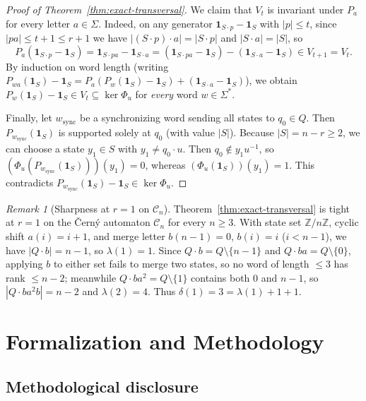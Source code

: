 \documentclass[11pt]{article}
\theoremstyle{definition}
\theoremstyle{remark}
\newtheorem{remark}[theorem]{Remark}
\newcommand{\ind}{\mathbf{1}}
\newcommand{\Z}{\mathbb{Z}}
\begin{document}
\begin{proof}[Proof of Theorem~\ref{thm:exact-transversal}]
We claim that $V_t$ is invariant under $P_a$ for every letter $a \in \Sigma$. Indeed, on any generator $\ind_{S \cdot p} - \ind_S$ with $|p| \le t$, since $|p a| \le t + 1 \le r + 1$ we have $|(S \cdot p) \cdot a| = |S \cdot p|$ and $|S \cdot a| = |S|$, so
\[
  P_a(\ind_{S \cdot p} - \ind_S) = \ind_{S \cdot p a} - \ind_{S \cdot a}
  = (\ind_{S \cdot p a} - \ind_S) - (\ind_{S \cdot a} - \ind_S) \in V_{t + 1} = V_t.
\]
By induction on word length (writing $P_{wa}(\ind_S) - \ind_S = P_a(P_w(\ind_S) - \ind_S) + (\ind_{S \cdot a} - \ind_S)$), we obtain $P_w(\ind_S) - \ind_S \in V_t \subseteq \ker \Phi_u$ for \emph{every} word $w \in \Sigma^*$.

Finally, let $w_{\mathrm{sync}}$ be a synchronizing word sending all states to $q_0 \in Q$. Then $P_{w_{\mathrm{sync}}}(\ind_S)$ is supported solely at $q_0$ (with value $|S|$). Because $|S| = n - r \ge 2$, we can choose a state $y_1 \in S$ with $y_1 \ne q_0 \cdot u$. Then $q_0 \notin y_1 u^{-1}$, so $(\Phi_u(P_{w_{\mathrm{sync}}}(\ind_S)))(y_1) = 0$, whereas $(\Phi_u(\ind_S))(y_1) = 1$. This contradicts $P_{w_{\mathrm{sync}}}(\ind_S) - \ind_S \in \ker \Phi_u$.
\end{proof}

\begin{remark}[Sharpness at $r = 1$ on $\mathcal{C}_n$]\label{rem:exact-transversal-sharp}
Theorem~\ref{thm:exact-transversal} is tight at $r = 1$ on the \v{C}ern\'y automaton $\mathcal{C}_n$ for every $n \ge 3$. With state set $\Z / n\Z$, cyclic shift $a(i) = i + 1$, and merge letter $b(n - 1) = 0$, $b(i) = i$ ($i < n - 1$), we have $|Q \cdot b| = n - 1$, so $\lambda(1) = 1$. Since $Q \cdot b = Q \setminus \{n - 1\}$ and $Q \cdot ba = Q \setminus \{0\}$, applying $b$ to either set fails to merge two states, so no word of length $\le 3$ has rank $\le n - 2$; meanwhile $Q \cdot ba^2 = Q \setminus \{1\}$ contains both $0$ and $n - 1$, so $|Q \cdot ba^2 b| = n - 2$ and $\lambda(2) = 4$. Thus $\delta(1) = 3 = \lambda(1) + 1 + 1$.
\end{remark}

\section{Formalization and Methodology}\label{sec:formalization}

\subsection{Methodological disclosure}
\end{document}
